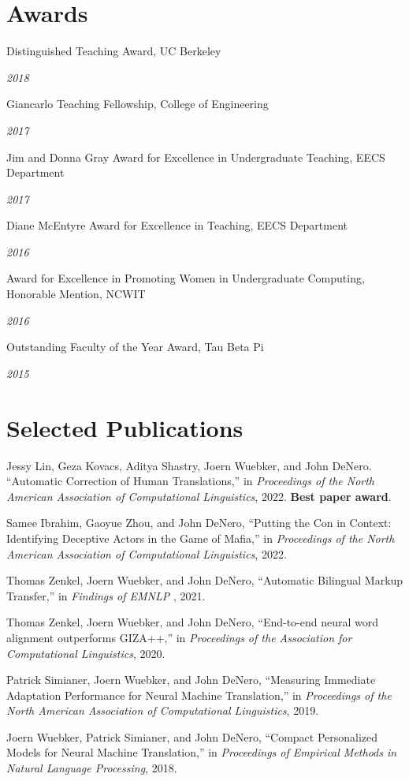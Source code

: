 \documentclass[margin,line]{res}
\newcommand{\dated}[2]{\parbox[t]{4.4in}{#1} \hspace{0.4in}
											 \parbox[t]{1in}{ {\it #2 } } }
\begin{document}
\begin{resume}
\section{\sc Awards}

\dated{Distinguished Teaching Award, UC Berkeley} { 2018 }

\dated{Giancarlo Teaching Fellowship, College of Engineering} { 2017 }

\dated{Jim and Donna Gray Award for Excellence in Undergraduate Teaching, EECS Department} { 2017 }

\dated{Diane McEntyre Award for Excellence in Teaching, EECS Department} { 2016 }

\dated{Award for Excellence in Promoting Women in Undergraduate Computing, Honorable Mention, NCWIT} { 2016 }

\dated{Outstanding Faculty of the Year Award, Tau Beta Pi} { 2015 }

\section{\sc Selected Publications}

\small

Jessy Lin, Geza Kovacs, Aditya Shastry, Joern Wuebker, and John DeNero. ``Automatic Correction of Human Translations,'' in {\it Proceedings of the North American Association of Computational Linguistics}, 2022. \textbf{Best paper award}.

Samee Ibrahim, Gaoyue Zhou, and John DeNero, ``Putting the Con in Context: Identifying Deceptive Actors in the Game of Mafia,'' in {\it Proceedings of the North American Association of Computational Linguistics}, 2022.

Thomas Zenkel, Joern Wuebker, and John DeNero, ``Automatic Bilingual Markup Transfer,'' in {\it Findings of EMNLP }, 2021.

Thomas Zenkel, Joern Wuebker, and John DeNero, ``End-to-end neural word alignment outperforms GIZA++,'' in {\it Proceedings of the Association for Computational Linguistics}, 2020.


Patrick Simianer, Joern Wuebker, and John DeNero, ``Measuring Immediate Adaptation Performance for Neural Machine Translation,'' in {\it Proceedings of the North American Association of Computational Linguistics}, 2019.

Joern Wuebker, Patrick Simianer, and John DeNero, ``Compact Personalized Models for Neural Machine Translation,'' in {\it Proceedings of Empirical Methods in Natural Language Processing}, 2018.


\end{resume}
\end{document}
